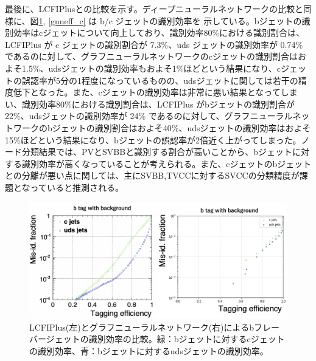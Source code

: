 最後に、LCFIPlusとの比較を示す。ディープニューラルネットワークの比較と同様に、図\ref{gnneff_b}, \ref{gnneff_c} は b/c ジェットの識別効率を
示している。bジェットの識別効率はcジェットについて向上しており、識別効率80\%における識別割合は、LCFIPlus が c ジェットの識別割合が 7.3\%、uds ジェットの識別効率が 0.74\% であるのに対して、グラフニューラルネットワークのcジェットの識別割合はおよそ1.5\%、udsジェットの識別効率もおよそ1\%ほどという結果になり、cジェットの誤認率が5分の1程度になっているものの、udsジェットに関しては若干の精度低下となった。また、cジェットの識別効率は非常に悪い結果となってしまい、識別効率80\%における識別割合は、LCFIPlus がbジェットの識別割合が 22\%、udsジェットの識別効率が 24\% であるのに対して、グラフニューラルネットワークのbジェットの識別割合はおよそ40\%、udsジェットの識別効率はおよそ15\%ほどという結果になり、bジェットの誤認率が2倍近く上がってしまった。ノード分類結果では、PVとSVBBと識別する割合が高いことから、bジェットに対する識別効率が高くなっていることが考えられる。また、cジェットのbジェットとの分離が悪い点に関しては、主にSVBB,TVCCに対するSVCCの分類精度が課題となっていると推測される。\\
\begin{figure}[H]
	\begin{center}
 \includegraphics[keepaspectratio, scale=0.33]
 	{Figure/Flavortagging/gnneff_b.png}
 		\caption{LCFIPlus(左)とグラフニューラルネットワーク(右)によるbフレーバージェットの識別効率の比較。緑：bジェットに対するcジェットの識別効率、青：bジェットに対するudsジェットの識別効率。}
 		\label{gnneff_b}
	\end{center}
\end{figure}

